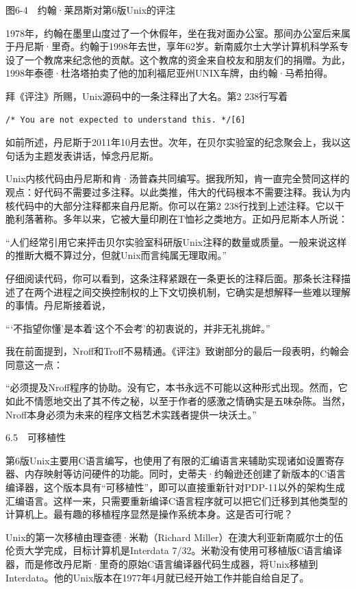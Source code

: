 \documentclass[a4paper,12pt,UTF8,twoside]{ctexbook}
\begin{document}
图6-4　约翰·莱昂斯对第6版Unix的评注

1978年，约翰在墨里山度过了一个休假年，坐在我对面办公室。那间办公室后来属于丹尼斯·里奇。约翰于1998年去世，享年62岁。新南威尔士大学计算机科学系专设了一个教席来纪念他的贡献。这个教席的资金来自校友和朋友们的捐赠。为此，1998年泰德·杜洛塔拍卖了他的加利福尼亚州UNIX车牌，由约翰·马希拍得。

拜《评注》所赐，Unix源码中的一条注释出了大名。第2 238行写着
\begin{lstlisting}
/* You are not expected to understand this. */[6]
\end{lstlisting}
如前所述，丹尼斯于2011年10月去世。次年，在贝尔实验室的纪念聚会上，我以这句话为主题发表讲话，悼念丹尼斯。

Unix内核代码由丹尼斯和肯·汤普森共同编写。据我所知，肯一直完全赞同这样的观点：好代码不需要过多注释。以此类推，伟大的代码根本不需要注释。我认为内核代码中的大部分注释都来自丹尼斯。你可以在第2 238行找到上述注释。它以干脆利落著称。多年以来，它被大量印刷在T恤衫之类地方。正如丹尼斯本人所说：

“人们经常引用它来抨击贝尔实验室科研版Unix注释的数量或质量。一般来说这样的推断大概不算过分，但就Unix而言纯属无理取闹。”



仔细阅读代码，你可以看到，这条注释紧跟在一条更长的注释后面。那条长注释描述了在两个进程之间交换控制权的上下文切换机制，它确实是想解释一些难以理解的事情。丹尼斯接着说，

“‘不指望你懂’是本着‘这个不会考’的初衷说的，并非无礼挑衅。”



我在前面提到，Nroff和Troff不易精通。《评注》致谢部分的最后一段表明，约翰会同意这一点：

“必须提及Nroff程序的协助。没有它，本书永远不可能以这种形式出现。然而，它如此不情愿地交出了其不传之秘，以至于作者的感激之情确实是五味杂陈。当然，Nroff本身必须为未来的程序文档艺术实践者提供一块沃土。”





6.5　可移植性


第6版Unix主要用C语言编写，也使用了有限的汇编语言来辅助实现诸如设置寄存器、内存映射等访问硬件的功能。同时，史蒂夫·约翰逊还创建了新版本的C语言编译器，这个版本具有“可移植性”，即可以直接重新针对PDP-11以外的架构生成汇编语言。这样一来，只需要重新编译C语言程序就可以把它们迁移到其他类型的计算机上。最有趣的移植程序显然是操作系统本身。这是否可行呢？

Unix的第一次移植由理查德·米勒（Richard Miller）在澳大利亚新南威尔士的伍伦贡大学完成，目标计算机是Interdata 7/32。米勒没有使用可移植版C语言编译器，而是修改丹尼斯·里奇的原始C语言编译器代码生成器，将Unix移植到Interdata。他的Unix版本在1977年4月就已经开始工作并能自给自足了。
\end{document}
